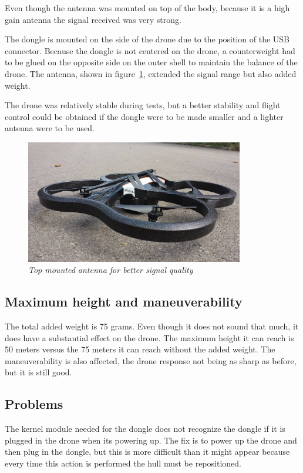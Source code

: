 Even though the antenna was mounted on top of the body, because it is a high gain antenna the signal received was very strong. 

The dongle is mounted on the side of the drone due to the position of the USB connector. Because the dongle is not centered on the drone, a counterweight had to be glued on the opposite side on the outer shell to maintain the balance of the drone. The antenna, shown in figure~\ref{fig:antenna}, extended the signal range but also added weight.

The drone was relatively stable during tests, but a better stability and flight control could be obtained if the dongle were to be made smaller and a lighter antenna were to be used.


\begin{figure}[ht]
\begin{center}
\includegraphics[width=0.85\textwidth]{img/parrot_antenna.jpg}
\end{center}
\caption{\small \itshape{Top mounted antenna for better signal quality}}
  \label{fig:antenna}
\end{figure}



\subsection{Maximum height and maneuverability}

The total added weight is 75 grams. Even though it does not sound that much, it does have a substantial effect on the drone. The maximum height it can reach is 50 meters versus the 75 meters it can reach without the added weight. The maneuverability is also affected, the drone response not being as sharp as before, but it is still good.

\subsection{Problems}

The kernel module needed for the dongle does not recognize the dongle if it is plugged in the drone when its powering up. The fix is to power up the drone and then plug in the dongle, but this is more difficult than it might appear because every time this action is performed the hull must be repositioned.

\clearpage
